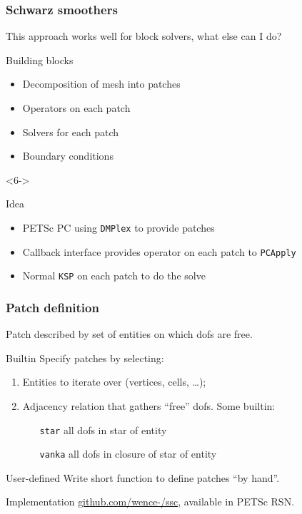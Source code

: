 \documentclass[presentation,aspectratio=43]{beamer}
\begin{document}
\begin{frame}
  \frametitle{Schwarz smoothers}
  This approach works well for block solvers, what else can I do?
  \begin{block}{Building blocks}
    \begin{itemize}
    \item Decomposition of mesh into patches
    \item Operators on each patch
    \item Solvers for each patch
    \item Boundary conditions
    \end{itemize}
  \end{block}
  \begin{uncoverenv}<6->
    \begin{block}{Idea}
      \begin{itemize}
      \item PETSc PC using \texttt{DMPlex} to provide patches
      \item Callback interface provides operator on each patch to
        \texttt{PCApply}
      \item Normal \texttt{KSP} on each patch to do the solve
      \end{itemize}
    \end{block}
  \end{uncoverenv}
\end{frame}

\begin{frame}[fragile]
  \frametitle{Patch definition}
  Patch described by set of entities on which dofs are free.
  \begin{block}{Builtin}
    \vspace{0.2ex}
    Specify patches by selecting:
    \begin{enumerate}
    \item Entities to iterate over (vertices, cells, \ldots);
    \item Adjacency relation that gathers ``free'' dofs.  Some builtin:
      \begin{itemize}
      \item[\texttt{star}] all dofs in star of entity
      \item[\texttt{vanka}] all dofs in closure of star of entity
      \end{itemize}
    \end{enumerate}
  \end{block}
  \begin{block}{User-defined}
    \vspace{0.2ex}
    Write short function to define patches ``by hand''.
  \end{block}
  \begin{block}{Implementation}
    \vspace{0.2ex}
    \url{github.com/wence-/ssc}, available in PETSc RSN.
  \end{block}
\end{frame}
\end{document}
